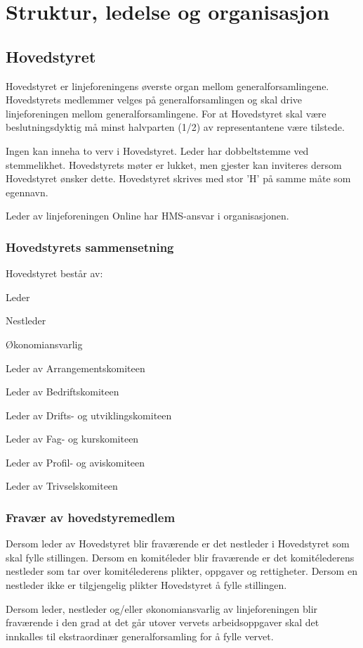 \chapter{Struktur, ledelse og organisasjon}
\section{Hovedstyret}
\vspace{23pt}

Hovedstyret er linjeforeningens øverste organ mellom generalforsamlingene. Hovedstyrets medlemmer velges på generalforsamlingen og skal drive linjeforeningen mellom generalforsamlingene. For at Hovedstyret skal være beslutningsdyktig må minst halvparten (1/2) av representantene være tilstede.\newline

Ingen kan inneha to verv i Hovedstyret. Leder har dobbeltstemme ved stemmelikhet. Hovedstyrets møter er lukket, men gjester kan inviteres dersom Hovedstyret ønsker dette. Hovedstyret skrives med stor ’H’ på samme måte som egennavn.

Leder av linjeforeningen Online har HMS-ansvar i organisasjonen.


\subsection{Hovedstyrets sammensetning}{
Hovedstyret består av:
\begin{liste}
	\item Leder
	\item Nestleder
	\item Økonomiansvarlig
	\item Leder av Arrangementskomiteen
	\item Leder av Bedriftskomiteen
	\item Leder av Drifts- og utviklingskomiteen
	\item Leder av Fag- og kurskomiteen
	\item Leder av Profil- og aviskomiteen
	\item Leder av Trivselskomiteen
\end{liste}
}


\subsection{Fravær av hovedstyremedlem}{
Dersom leder av Hovedstyret blir fraværende er det nestleder i Hovedstyret som skal fylle stillingen. Dersom en komitéleder blir fraværende er det komitélederens nestleder som tar over komitélederens plikter, oppgaver og rettigheter. Dersom en nestleder ikke er tilgjengelig plikter Hovedstyret å fylle stillingen.

Dersom leder, nestleder og/eller økonomiansvarlig av linjeforeningen blir fraværende i den grad at det går utover vervets arbeidsoppgaver skal det innkalles til ekstraordinær generalforsamling for å fylle vervet.
}

